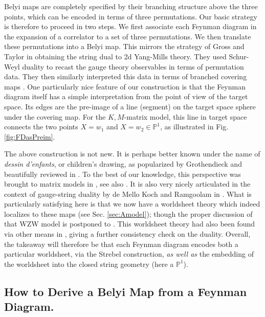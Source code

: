 \documentclass[english]{article}
\renewcommand{\>}{\rangle}
\newcommand{\<}{\langle}
\renewcommand{\(}{\left(}
\renewcommand{\)}{\right)}
\begin{document}
Belyi maps are completely specified by their branching structure above the three points, which can be encoded in terms of three permutations. Our basic strategy is therefore to proceed in two steps. We first associate each Feynman diagram in the expansion of a correlator to a set of three permutations. We then translate these permutations into a Belyi map. This mirrors the strategy of Gross and Taylor in obtaining the string dual to 2d Yang-Mills theory. They used Schur-Weyl duality to recast the gauge theory observables in terms of permutation data. They then similarly interpreted this data in terms of branched covering maps \cite{Gross:1993cw, Gross:1993hu, Cordes:1994sd}. One particularly nice feature of our construction is that the Feynman diagram itself has a simple interpretation from the point of view of the target space. Its edges are the pre-image of a line (segment) on the target space sphere under the covering map. For the $K,M$-matrix model, this line in target space connects the two points $X = w_1$ and $X = w_2 \in \mathbb{P}^{1}$, as illustrated in Fig. \ref{fig:FDasPreim}.

The above construction is not new. It is perhaps better known under the name of \textit{dessin d'enfants}, or children's drawing, as popularized by Grothendieck \cite{grothendieck1984} and beautifully reviewed in \cite{Lando2003GraphsOS}. To the best of our knowledge, this perspective was brought to matrix models in \cite{DiFrancescoItzykson}, see also \cite{KostovMAPS}. It is also very nicely articulated in the context of gauge-string duality by de Mello Koch and Ramgoolam in \cite{deMelloKoch:2010hav}. What is particularly satisfying here is that we now have a worldsheet theory which indeed localizes to these maps (see Sec. \ref{sec:Amodel}); though the proper discussion of that WZW model is postponed to \cite{DSDIII}. This worldsheet theory had also been found via other means in \cite{DSDI}, giving a further consistency check on the duality. Overall, the takeaway will therefore be that each Feynman diagram encodes both a particular worldsheet, via the Strebel construction, \textit{as well as} the embedding of the worldsheet into the closed string geometry (here a $\mathbb{P}^1$).



\subsection{How to Derive a Belyi Map from a Feynman Diagram.}\label{subsec:deriveBelyi}
\end{document}
